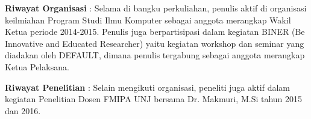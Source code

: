 \noindent \textbf{Riwayat Organisasi} : Selama di bangku perkuliahan, penulis aktif di organisasi keilmiahan Program Studi Ilmu Komputer sebagai anggota merangkap Wakil Ketua periode 2014-2015. Penulis juga berpartisipasi dalam kegiatan BINER (Be Innovative and Educated Researcher) yaitu kegiatan workshop dan seminar yang diadakan oleh DEFAULT, dimana penulis tergabung sebagai anggota merangkap Ketua Pelaksana. 

\noindent \textbf{Riwayat Penelitian} : Selain mengikuti organisasi, peneliti juga aktif dalam kegiatan Penelitian Dosen FMIPA UNJ bersama Dr. Makmuri, M.Si tahun 2015 dan 2016. 